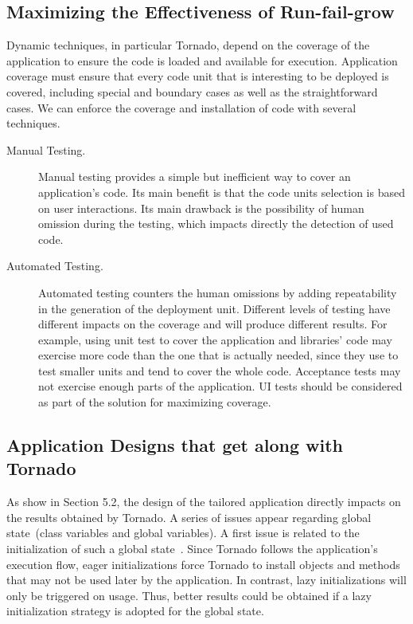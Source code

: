 \subsection{Maximizing the Effectiveness of Run-fail-grow}\label{sec:maximize_effectiveness}

Dynamic techniques, in particular Tornado, depend on the coverage of the application to ensure the code is loaded and available for execution. Application coverage must ensure that every code unit that is interesting to be deployed is covered, including special and boundary cases as well as the straightforward cases. We can enforce the coverage and installation of code with several techniques. 

\begin{description}
\item[Manual Testing.] Manual testing provides a simple but inefficient way to cover an application's code. Its main benefit is that the code units selection is based on user interactions. Its main drawback is the possibility of human omission during the testing, which impacts directly the detection of used code. 
\item[Automated Testing.] Automated testing counters the human omissions by adding repeatability in the generation of the deployment unit. Different levels of testing have different impacts on the coverage and will produce different results. For example, using unit test to cover the application and libraries' code may exercise more code than the one that is actually needed, since they use to test smaller units and tend to cover the whole code. Acceptance tests may not exercise enough parts of the application. UI tests should be considered as part of the solution for maximizing coverage.
\end{description}


\subsection{Application Designs that get along with Tornado} As show in Section 5.2, the design of the tailored application directly impacts on the results obtained by Tornado. A series of issues appear regarding global state~(\eg class variables and global variables). A first issue is related to the initialization of such a global state~\cite{Unga95a}. Since Tornado follows the application's execution flow, eager initializations force Tornado to install objects and methods that may not be used later by the application. In contrast, lazy initializations will only be triggered on usage. Thus, better results could be obtained if a lazy initialization strategy is adopted for the global state.

